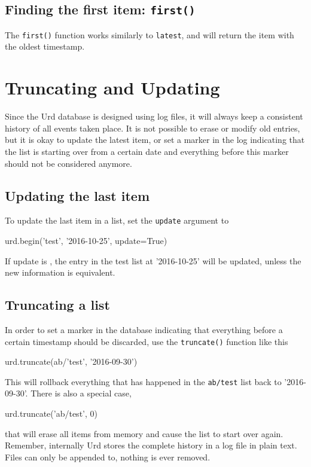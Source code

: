 \subsection{Finding the first item:  \texttt{first()}}
The \texttt{first()} function works similarly to \texttt{latest}, and
will return the item with the oldest timestamp.



\section{Truncating and Updating}
\label{sec:trunc-update}
Since the Urd database is designed using log files, it will always
keep a consistent history of all events taken place.  It is not
possible to erase or modify old entries, but it is okay to update the
latest item, or set a marker in the log indicating that the list is
starting over from a certain date and everything before this marker
should not be considered anymore.

\subsection{Updating the last item}
To update the last item in a list, set the \texttt{update} argument
to \pyTrue
\begin{python}
urd.begin('test', '2016-10-25', update=True)
\end{python}
If update is \pyTrue, the entry in the test list at '2016-10-25' will
be updated, unless the new information is equivalent.

\subsection{Truncating a list}
In order to set a marker in the database indicating that everything
before a certain timestamp should be discarded, use
the \texttt{truncate()} function like this
\begin{python}
urd.truncate(ab/'test', '2016-09-30')
\end{python}
This will rollback everything that has happened in
the \texttt{ab/test} list back to '2016-09-30'.  There is also a
special case,
\begin{python}
urd.truncate('ab/test', 0)
\end{python}
that will erase all items from memory and cause the list to start over
again.  Remember, internally Urd stores the complete history in a log
file in plain text.  Files can only be appended to, nothing is ever
removed.




